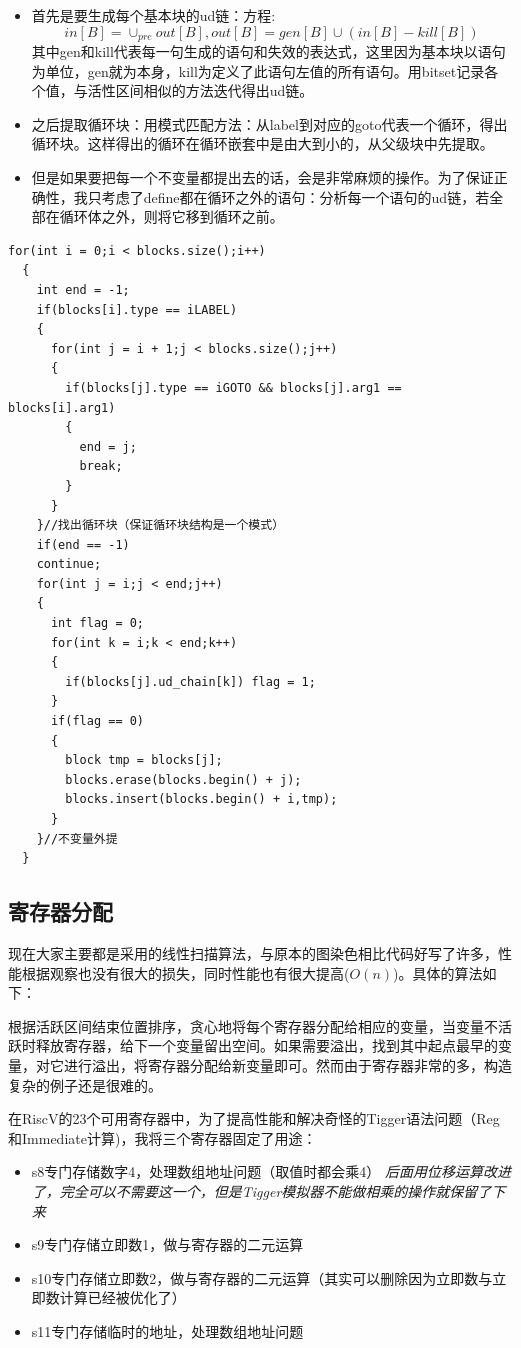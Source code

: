 \documentclass{ctexart}
\begin{document}
\begin{itemize}
  \begin{itemize}
    \item 首先是要生成每个基本块的ud链：方程:$$in[B] = \cup_{pre} out[B], out[B] = gen[B] \cup (in[B] - kill[B])$$其中gen和kill代表每一句生成的语句和失效的表达式，这里因为基本块以语句为单位，gen就为本身，kill为定义了此语句左值的所有语句。用bitset记录各个值，与活性区间相似的方法迭代得出ud链。
    \item 之后提取循环块：用模式匹配方法：从label到对应的goto代表一个循环，得出循环块。这样得出的循环在循环嵌套中是由大到小的，从父级块中先提取。
    \item 但是如果要把每一个不变量都提出去的话，会是非常麻烦的操作。为了保证正确性，我只考虑了define都在循环之外的语句：分析每一个语句的ud链，若全部在循环体之外，则将它移到循环之前。
  \end{itemize}

  \begin{lstlisting}[basicstyle=\listingsfont,caption={函数结构},captionpos=b]
  for(int i = 0;i < blocks.size();i++)
  {
    int end = -1;
    if(blocks[i].type == iLABEL)
    {
      for(int j = i + 1;j < blocks.size();j++)
      {
        if(blocks[j].type == iGOTO && blocks[j].arg1 == blocks[i].arg1)
        {
          end = j;
          break;
        }
      }
    }//找出循环块（保证循环块结构是一个模式）
    if(end == -1)
    continue;
    for(int j = i;j < end;j++)
    {
      int flag = 0;
      for(int k = i;k < end;k++)
      {
        if(blocks[j].ud_chain[k]) flag = 1;
      }
      if(flag == 0)
      {
        block tmp = blocks[j];
        blocks.erase(blocks.begin() + j);
        blocks.insert(blocks.begin() + i,tmp);
      }
    }//不变量外提
  }
  \end{lstlisting}
\end{itemize}

\subsection{寄存器分配}

现在大家主要都是采用的线性扫描算法，与原本的图染色相比代码好写了许多，性能根据观察也没有很大的损失，同时性能也有很大提高($O(n)$)。具体的算法如下：

根据活跃区间结束位置排序，贪心地将每个寄存器分配给相应的变量，当变量不活跃时释放寄存器，给下一个变量留出空间。如果需要溢出，找到其中起点最早的变量，对它进行溢出，将寄存器分配给新变量即可。然而由于寄存器非常的多，构造复杂的例子还是很难的。

在RiscV的23个可用寄存器中，为了提高性能和解决奇怪的Tigger语法问题（Reg和Immediate计算)，我将三个寄存器固定了用途：
\begin{itemize}
  \item s8专门存储数字4，处理数组地址问题（取值时都会乘4）
  \emph{后面用位移运算改进了，完全可以不需要这一个，但是Tigger模拟器不能做相乘的操作就保留了下来}
  \item s9专门存储立即数1，做与寄存器的二元运算
  \item s10专门存储立即数2，做与寄存器的二元运算（其实可以删除因为立即数与立即数计算已经被优化了）
  \item s11专门存储临时的地址，处理数组地址问题
\end{itemize}
\end{document}
